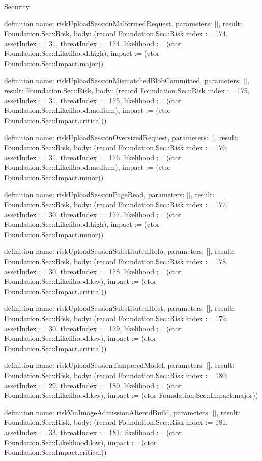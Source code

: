 \begin{lexlean}{Security}
\begin{semanticmodule}
definition{
  name: riskUploadSessionMalformedRequest,
  parameters: [],
  result: Foundation.Sec::Risk,
  body: (record Foundation.Sec::Risk {index := 174, assetIndex := 31, threatIndex := 174, likelihood := (ctor Foundation.Sec::Likelihood.high), impact := (ctor Foundation.Sec::Impact.major)})
}

definition{
  name: riskUploadSessionMismatchedBlobCommitted,
  parameters: [],
  result: Foundation.Sec::Risk,
  body: (record Foundation.Sec::Risk {index := 175, assetIndex := 31, threatIndex := 175, likelihood := (ctor Foundation.Sec::Likelihood.medium), impact := (ctor Foundation.Sec::Impact.critical)})
}

definition{
  name: riskUploadSessionOversizedRequest,
  parameters: [],
  result: Foundation.Sec::Risk,
  body: (record Foundation.Sec::Risk {index := 176, assetIndex := 31, threatIndex := 176, likelihood := (ctor Foundation.Sec::Likelihood.medium), impact := (ctor Foundation.Sec::Impact.minor)})
}

definition{
  name: riskUploadSessionPageRead,
  parameters: [],
  result: Foundation.Sec::Risk,
  body: (record Foundation.Sec::Risk {index := 177, assetIndex := 30, threatIndex := 177, likelihood := (ctor Foundation.Sec::Likelihood.high), impact := (ctor Foundation.Sec::Impact.minor)})
}

definition{
  name: riskUploadSessionSubstitutedHolo,
  parameters: [],
  result: Foundation.Sec::Risk,
  body: (record Foundation.Sec::Risk {index := 178, assetIndex := 30, threatIndex := 178, likelihood := (ctor Foundation.Sec::Likelihood.low), impact := (ctor Foundation.Sec::Impact.critical)})
}

definition{
  name: riskUploadSessionSubstitutedHost,
  parameters: [],
  result: Foundation.Sec::Risk,
  body: (record Foundation.Sec::Risk {index := 179, assetIndex := 30, threatIndex := 179, likelihood := (ctor Foundation.Sec::Likelihood.low), impact := (ctor Foundation.Sec::Impact.critical)})
}

definition{
  name: riskUploadSessionTamperedModel,
  parameters: [],
  result: Foundation.Sec::Risk,
  body: (record Foundation.Sec::Risk {index := 180, assetIndex := 29, threatIndex := 180, likelihood := (ctor Foundation.Sec::Likelihood.low), impact := (ctor Foundation.Sec::Impact.major)})
}

definition{
  name: riskVmImageAdmissionAlteredBuild,
  parameters: [],
  result: Foundation.Sec::Risk,
  body: (record Foundation.Sec::Risk {index := 181, assetIndex := 33, threatIndex := 181, likelihood := (ctor Foundation.Sec::Likelihood.low), impact := (ctor Foundation.Sec::Impact.critical)})
}


\end{semanticmodule}
\end{lexlean}
